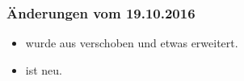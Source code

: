 \documentclass[paper=a4,fontsize=12pt,parskip=half,twoside]{scrartcl}
\begin{document}
\subsubsection*{Änderungen vom 19.10.2016}
\begin{itemize}[noitemsep]
\item {} wurde aus  verschoben und etwas erweitert.
\item {} ist neu.
\end{itemize}

\newpage
\tableofcontents{}

\cleardoublepage


\cleardoublepage


\cleardoublepage


\cleardoublepage


\cleardoublepage


\cleardoublepage


\appendix{}

\cleardoublepage


\cleardoublepage


\cleardoublepage


\cleardoublepage


\listoftodos[Notes]

\printbibliography
\end{document}

